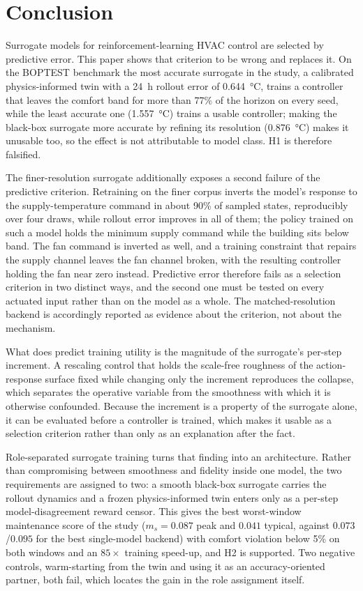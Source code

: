 \documentclass{ieeeaccess}
\newcommand{\ms}{\ensuremath{m_s}}
\begin{document}
\section{Conclusion}
\label{sec:conclusions}

Surrogate models for reinforcement-learning HVAC control are selected by
predictive error. This paper shows that criterion to be wrong and replaces it.
On the BOPTEST benchmark the most accurate surrogate in the study, a calibrated
physics-informed twin with a 24~h rollout error of \SI{0.644}{\celsius}, trains
a controller that leaves the comfort band for more than 77\% of the horizon on
every seed, while the least accurate one (\SI{1.557}{\celsius}) trains a usable
controller; making the black-box surrogate more accurate by refining its
resolution (\SI{0.876}{\celsius}) makes it unusable too, so the effect is not
attributable to model class. H1 is therefore falsified.

The finer-resolution surrogate additionally exposes a second failure of the
predictive criterion. Retraining on the finer corpus inverts the model's
response to the supply-temperature command in about 90\% of sampled states,
reproducibly over four draws, while rollout error improves in all of them; the
policy trained on such a model holds the minimum supply command while the
building sits below band. The fan command is inverted as well, and a training
constraint that repairs the supply channel leaves the fan channel broken, with
the resulting controller holding the fan near zero instead. Predictive error
therefore fails as a selection criterion in two distinct ways, and the second
one must be tested on every actuated input rather than on the model as a whole.
The matched-resolution backend is accordingly reported as evidence about the
criterion, not about the mechanism.

What does predict training utility is the magnitude of the surrogate's per-step
increment. A rescaling control that holds the scale-free roughness of the
action-response surface fixed while changing only the increment reproduces the
collapse, which separates the operative variable from the smoothness with which
it is otherwise confounded. Because the increment is a property of the surrogate
alone, it can be evaluated before a controller is trained, which makes it usable
as a selection criterion rather than only as an explanation after the fact.

Role-separated surrogate training turns that finding into an architecture.
Rather than compromising between smoothness and fidelity inside one model, the
two requirements are assigned to two: a smooth black-box surrogate carries the
rollout dynamics and a frozen physics-informed twin enters only as a per-step
model-disagreement reward censor. This gives the best worst-window maintenance
score of the study ($\ms=0.087$ peak and $0.041$ typical, against
$0.073$/$0.095$ for the best single-model backend) with comfort violation below
5\% on both windows and an $85\times$ training speed-up, and H2 is supported.
Two negative controls, warm-starting from the twin and using it as an
accuracy-oriented partner, both fail, which locates the gain in the role
assignment itself.
\end{document}
